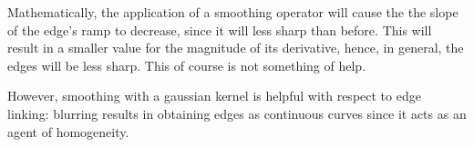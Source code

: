 Mathematically, the application of a smoothing operator will cause the the slope of the edge's ramp to decrease, since it will less sharp than before.
This will result in a smaller value for the magnitude of its derivative, hence, in general, the edges will be less sharp. This of course is not something
of help.

However, smoothing with a gaussian kernel is helpful with respect to edge linking: blurring results in obtaining edges as continuous curves since it 
acts as an agent of homogeneity.
